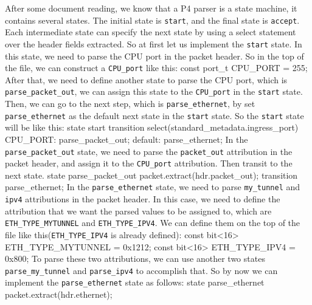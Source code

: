 \documentclass{article}%
\newenvironment{code}%
   {\snugshade\verbatim}%
   {\endverbatim\endsnugshade}
\begin{document}
\begin{Large}
After some document reading, we know that a P4 parser is a state machine, it contains several states. The initial state is \texttt{start}, and the final state is \texttt{accept}. Each intermediate state can specify the next state by using a select statement over the header fields extracted. So at first let us implement the \texttt{start} state. In this state, we need to parse the CPU port in the packet header. So in the top of the file, we can construct a \texttt{CPU\_port} like this:
\begin{code}
    const port_t CPU_PORT = 255;
\end{code}
After that, we need to define another state to parse the CPU port, which is \texttt{parse\_packet\_out}, we can assign this state to the \texttt{CPU\_port} in the \texttt{start} state. Then, we can go to the next step, which is \texttt{parse\_ethernet}, by set \texttt{parse\_ethernet} as the default next state in the \texttt{start} state. So the \texttt{start} state will be like this:
\newpage
\begin{code}
    state start {
        transition select(standard_metadata.ingress_port) {
            CPU_PORT: parse_packet_out;
            default: parse_ethernet;
        }
    }
\end{code}
In the \texttt{parse\_packet\_out} state, we need to parse the \texttt{packet\_out} attribution in the packet header, and assign it to the \texttt{CPU\_port} attribution. Then transit to the next state.
\begin{code}
    state parse_packet_out {
        packet.extract(hdr.packet_out);
        transition parse_ethernet;
    }
\end{code}
In the \texttt{parse\_ethernet} state, we need to parse \texttt{my\_tunnel} and \texttt{ipv4} attributions in the packet header. In this case, we need to define the attribution that we want the parsed values to be assigned to, which are \texttt{ETH\_TYPE\_MYTUNNEL} and \texttt{ETH\_TYPE\_IPV4}. We can define them on the top of the file like this(\texttt{ETH\_TYPE\_IPV4} is already defined):
\begin{code}
    const bit<16> ETH_TYPE_MYTUNNEL = 0x1212;
    const bit<16> ETH_TYPE_IPV4 = 0x800;
\end{code}
To parse these two attributions, we can use another two states \texttt{parse\_my\_tunnel} and \texttt{parse\_ipv4} to accomplish that. So by now we can implement the \texttt{parse\_ethernet} state as follows:
\begin{code}
    state parse_ethernet {
        packet.extract(hdr.ethernet);
}
\end{code}
\end{Large}
\end{document}
